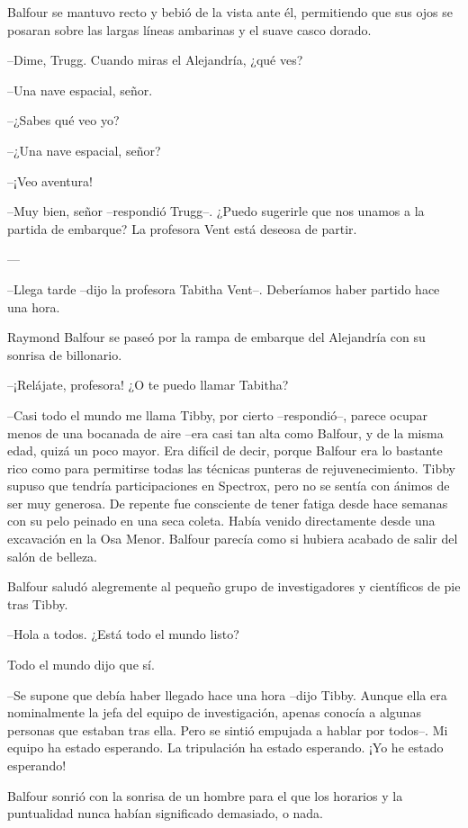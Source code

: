 {Balfour se mantuvo recto y bebió de la vista ante él, permitiendo que
 sus ojos se posaran sobre las largas líneas ambarinas y el suave casco
dorado.}

{--Dime, Trugg. Cuando miras el Alejandría, ¿qué ves?}

{--Una nave espacial, señor.}

{--¿Sabes qué veo yo?}

{--¿Una nave espacial, señor?}

{--¡Veo aventura!}

{--Muy bien, señor --respondió Trugg--. ¿Puedo sugerirle que nos unamos a
la partida de embarque? La profesora Vent está deseosa de partir.}

{---}

{--Llega tarde --dijo la profesora Tabitha Vent--. Deberíamos haber
partido hace una hora.}

{Raymond Balfour se paseó por la rampa de embarque del Alejandría con su
sonrisa de billonario.}

{--¡Relájate, profesora! ¿O te puedo llamar Tabitha?}

{--Casi todo el mundo me llama Tibby, por cierto --respondió--, parece
 ocupar menos de una bocanada de aire --era casi tan alta como Balfour, y
 de la misma edad, quizá un poco mayor. Era difícil de decir, porque
 Balfour era lo bastante rico como para permitirse todas las técnicas
 punteras de rejuvenecimiento. Tibby supuso que tendría participaciones
 en Spectrox, pero no se sentía con ánimos de ser muy generosa. De
 repente fue consciente de tener fatiga desde hace semanas con su pelo
 peinado en una seca coleta. Había venido directamente desde una
 excavación en la Osa Menor. Balfour parecía como si hubiera acabado de
salir del salón de belleza.}

{Balfour saludó alegremente al pequeño grupo de investigadores y
científicos de pie tras Tibby.}

{--Hola a todos. ¿Está todo el mundo listo?}

{Todo el mundo dijo que sí.}

{--Se supone que debía haber llegado hace una hora --dijo Tibby. Aunque
 ella era nominalmente la jefa del equipo de investigación, apenas
 conocía a algunas personas que estaban tras ella. Pero se sintió
 empujada a hablar por todos--. Mi equipo ha estado esperando. La
tripulación ha estado esperando. ¡Yo he estado esperando!}

{Balfour sonrió con la sonrisa de un hombre para el que los horarios y la
puntualidad nunca habían significado demasiado, o nada.}

